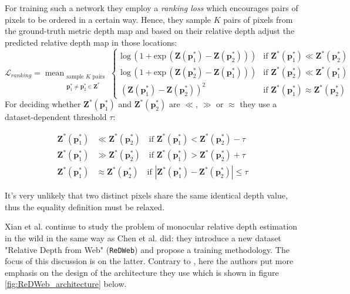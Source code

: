 For training such a network they employ a \textit{ranking loss} which encourages pairs of pixels to be ordered in a certain way.
Hence, they sample $K$ pairs of pixels from the ground-truth metric depth map and based on their relative depth adjust the predicted relative depth map in those locations:
\[
	\mathcal{L}_{ranking} = \mathop{\text{mean}}_{
		\substack{
			\text{sample } K \text{ pairs}\\
			 \mathbf{p}^{*}_{1} \neq \mathbf{p}^{*}_{2} \in \mathbf{Z}^{*}}
		}
	\begin{cases}
		\text{log} \, ( 1 + \text{exp} \, ( \mathbf{Z}(\mathbf{p}^{*}_{1}) - \mathbf{Z}(\mathbf{p}^{*}_{2}) )) &
			\text{if } \mathbf{Z}^{*}(\mathbf{p}^{*}_{1}) \ll \mathbf{Z}^{*}(\mathbf{p}^{*}_{2}) \\
		\text{log} \, ( 1 + \text{exp} \, ( \mathbf{Z}(\mathbf{p}^{*}_{2}) - \mathbf{Z}(\mathbf{p}^{*}_{1}) )) &
			\text{if } \mathbf{Z}^{*}(\mathbf{p}^{*}_{2}) \ll \mathbf{Z}^{*}(\mathbf{p}^{*}_{1}) \\
		(\mathbf{Z}(\mathbf{p}^{*}_{1}) - \mathbf{Z}(\mathbf{p}^{*}_{2}) )^{2} &
			\text{if } \mathbf{Z}^{*}(\mathbf{p}^{*}_{1}) \approx \mathbf{Z}^{*}(\mathbf{p}^{*}_{2})
	\end{cases}
\]
For deciding whether $\mathbf{Z}^{*}(\mathbf{p}^{*}_{1})$ and  $\mathbf{Z}^{*}(\mathbf{p}^{*}_{2})$ are $\ll$, $\gg$ or $\approx$ they use a dataset-dependent threshold $\tau$:

\begin{align*}
	\mathbf{Z}^{*}(\mathbf{p}^{*}_{1}) & \ll \mathbf{Z}^{*}(\mathbf{p}^{*}_{2}) \quad
		\text{if } \mathbf{Z}^{*}(\mathbf{p}^{*}_{1}) < \mathbf{Z}^{*}(\mathbf{p}^{*}_{2}) - \tau\\
	\mathbf{Z}^{*}(\mathbf{p}^{*}_{1}) & \gg \mathbf{Z}^{*}(\mathbf{p}^{*}_{2}) \quad
		\text{if } \mathbf{Z}^{*}(\mathbf{p}^{*}_{1}) > \mathbf{Z}^{*}(\mathbf{p}^{*}_{2}) + \tau\\
	\mathbf{Z}^{*}(\mathbf{p}^{*}_{1}) & \approx \mathbf{Z}^{*}(\mathbf{p}^{*}_{2}) \quad
		\text{if } |\mathbf{Z}^{*}(\mathbf{p}^{*}_{1}) - \mathbf{Z}^{*}(\mathbf{p}^{*}_{2})| \leq \tau
\end{align*}

It's very unlikely that two distinct pixels share the same identical depth value, thus the equality definition must be relaxed.

Xian et al. \cite{ReDWeb} continue to study the problem of monocular relative depth estimation in the wild in the same way as Chen et al. \cite{DIW} did: they introduce a new dataset "Relative Depth from Web" (\texttt{ReDWeb}) and propose a training methodology.
The focus of this discussion is on the latter.
Contrary to \cite{DIW}, here the authors put more emphasis on the design of the architecture they use which is shown in figure \ref{fig:ReDWeb_architecture} below.

